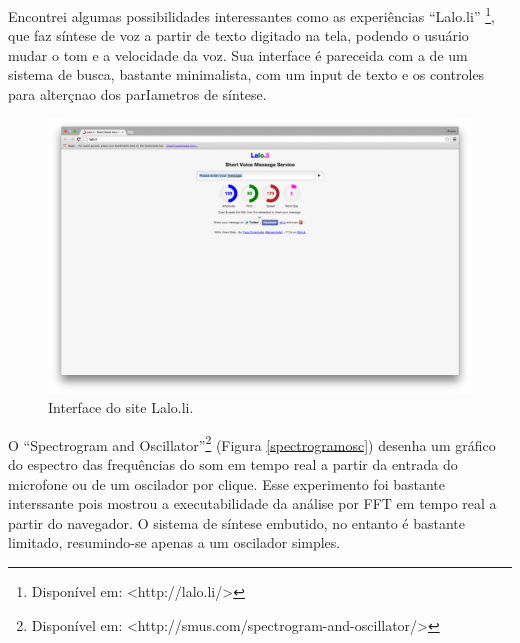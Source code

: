 Encontrei algumas possibilidades interessantes como as experiências ``Lalo.li'' \footnote{Disponível em: <http://lalo.li/> }, que faz síntese de voz a partir de texto digitado na tela, podendo o usuário mudar o tom e a velocidade da voz. Sua interface é pareceida com a de um sistema de busca, bastante minimalista, com um input de texto e os controles para alterçnao dos parIametros de síntese.

\begin{figure}
    \caption{\label{laloli}Interface do site Lalo.li.}
    
        \includegraphics[width=1\linewidth]{pictures/cap2/laloli}
    
\end{figure}

O ``Spectrogram and Oscillator''\footnote{Disponível em: <http://smus.com/spectrogram-and-oscillator/>} (Figura \ref{spectrogramosc}) desenha um gráfico do espectro das frequências do som em tempo real a partir da entrada do microfone ou de um oscilador por clique. Esse experimento foi bastante interssante pois mostrou a executabilidade da análise por FFT em tempo real a partir do navegador. O sistema de síntese embutido, no entanto é bastante limitado, resumindo-se apenas a um oscilador simples.   



